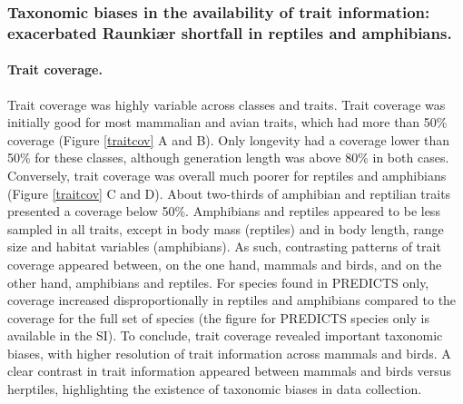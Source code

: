 \subsubsection{Taxonomic biases in the availability of trait information: exacerbated Raunki{\ae}r shortfall in reptiles and amphibians.}

\paragraph{Trait coverage.}
Trait coverage was highly variable across classes and traits. Trait coverage was initially good for most mammalian and avian traits, which had more than 50\% coverage (Figure \ref{traitcov} A and B). Only longevity had a coverage lower than 50\% for these classes, although generation length was above 80\% in both cases. Conversely, trait coverage was overall much poorer for reptiles and amphibians (Figure \ref{traitcov} C and D). About two-thirds of amphibian and reptilian traits presented a coverage below 50\%.  Amphibians and reptiles appeared to be less sampled in all traits, except in body mass (reptiles) and in body length, range size and habitat variables (amphibians).  As such, contrasting patterns of trait coverage appeared between, on the one hand, mammals and birds, and on the other hand, amphibians and reptiles. For species found in PREDICTS only, coverage increased disproportionally in reptiles and amphibians compared to the coverage for the full set of species (the figure for PREDICTS species only is available in the SI). To conclude, trait coverage revealed important taxonomic biases, with higher resolution of trait information across mammals and birds. A clear contrast in trait information appeared between mammals and birds versus herptiles, highlighting the existence of taxonomic biases in data collection.


